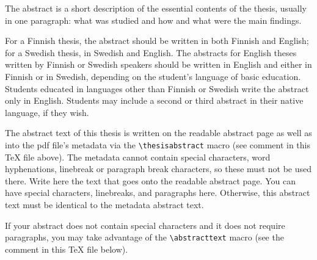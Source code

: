 \documentclass[english, 12pt, a4paper, sci, utf8, a-2b, online]{aaltothesis}
\date{19 February 2026}
\begin{document}
\makecoverpage

\makecopyrightpage

\clearpage

\begin{abstractpage}[english]
  The abstract is a short description of the essential contents of the thesis,
  usually in one paragraph: what was studied and how and what were the main
  findings.

  For a Finnish thesis, the abstract should be written in both Finnish and
  English; for a Swedish thesis, in Swedish and English. The abstracts for
  English theses written by Finnish or Swedish speakers should be written in
  English and either in Finnish or in Swedish, depending on the student’s
  language of basic education. Students educated in languages other than Finnish
  or Swedish write the abstract only in English. Students may include a second
  or third abstract in their native language, if they wish.

  The abstract text of this thesis is written on the readable abstract page as
  well as into the pdf file's metadata via the \verb+\thesisabstract+ macro
  (see comment in this \TeX{} file above). The metadata cannot contain special 
  characters, word hyphenations, linebreak or paragraph break characters, so 
  these must not be used there. Write here the text that goes onto the readable 
  abstract page. You can have special characters, linebreaks, and paragraphs 
  here. Otherwise, this abstract text must be identical to the metadata abstract 
  text.
  
  If your abstract does not contain special characters and it does not require
  paragraphs, you may take advantage of the \verb+\abstracttext+ macro (see the
  comment in this \TeX{} file below).
\end{abstractpage}
\end{document}
